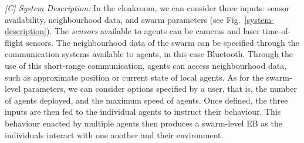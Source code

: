 \documentclass[runningheads]{llncs}
\begin{document}


\emph{[C] System Description:}
In the cloakroom, we can consider three inputs: sensor availability, neighbourhood data, and swarm parameters (see Fig.~\ref{system-description}). The \emph{sensors} available to agents can be cameras and laser time-of-flight sensors. 
The neighbourhood data of the swarm can be specified through the communication systems available to agents, in this case Bluetooth. 
Through the use of this short-range communication, agents can access neighbourhood data, such as approximate position or current state of local agents.  
As for the swarm-level parameters, we can consider options specified by a user, that is, the number of agents deployed, and the maximum speed of agents. %
Once defined, the three inputs are then fed to the individual agents to instruct their behaviour. This behaviour enacted by multiple agents then produces a swarm-level EB as the individuals interact with one another and their environment. 
\end{document}
